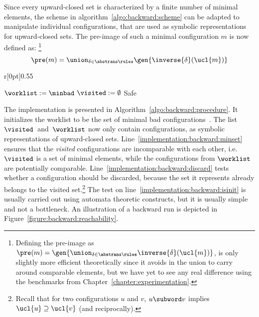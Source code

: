 %
Since every upward-closed set is characterized by a finite number of
minimal elements, the scheme in algorithm~\ref{algo:backward:scheme}
can be adapted to manipulate individual configurations, that are used
as symbolic representations for upward-closed sets.
%
%
%
The pre-image of such a minimal configuration $m$ is now defined as:%
\footnote{Defining the pre-image as $\pre(m) =
  \gen{\union_{\delta\in\abstrans\rules}\inverse{\delta}(\ucl{m})}$,
  is only slightly more efficient theoretically since it avoids in the
  union to carry around comparable elements, but we have yet to see
  any real difference using the benchmarks from
  Chapter~\ref{chapter:experimentation}.} %
$$
\pre(m) = \union_{\delta\in\abstrans\rules}\gen{\inverse{\delta}(\ucl{m})}%
$$

%
%
\begin{wrapfigure}{r}[0pt]{0.55\textwidth}
\hfill%
\begin{minipage}{0.56\textwidth}
\begin{algorithm}[H]
\DontPrintSemicolon
\caption{Backward Procedure}
\label{algo:backward:procedure}
$\worklist := \minbad$\;%
$\visited := \emptyset$\;%
%
\Return Safe%
\end{algorithm}
\end{minipage}%
\end{wrapfigure}
%
The implementation is presented in
Algorithm~\ref{algo:backward:procedure}.
%
It initializes the worklist to be the set of minimal bad
configurations~{\minbad}.
%
The list $\visited$~and~$\worklist$ now only contain configurations,
as symbolic representations of upward-closed sets.
%
Line~\ref{implementation:backward:minset} ensures that the
\emph{visited} configurations are incomparable with each other, i.e.\
$\visited$ is a set of minimal elements, while the configurations from
$\worklist$ are potentially comparable.
%
Line~\ref{implementation:backward:discard} tests whether a
configuration should be discarded, because the set it represents
already belongs to the visited set.\footnote{Recall that for two
  configurations $u$ and $v$, $u\subword v$ implies
  $\ucl{u}\supseteq\ucl{v}$ (and reciprocally).} %
%
The test on line~\ref{implementation:backward:isinit} is usually
carried out using automata theoretic constructs, but it is usually
simple and not a bottleneck.
%
An illustration of a backward run is depicted in
Figure~\ref{figure:backward:reachability}.

